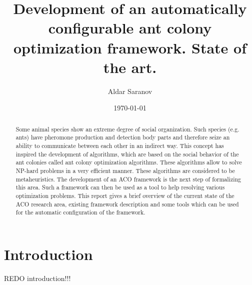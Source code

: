\documentclass[12pt]{article}
\author{Aldar Saranov}
\date{\today}
\title{Development of an automatically configurable ant colony optimization framework. State of the art.}
\begin{document}
\maketitle 
\newpage

\tableofcontents
\newpage

\begin{abstract}
Some animal species show an extreme degree of social organization. Such species (e.g. ants) have pheromone production and detection body parts and therefore seize an ability to communicate between each other in an indirect way. This concept has inspired the development of algorithms, which are based on the social behavior of the ant colonies called ant colony optimization algorithms. These algorithms allow to solve NP-hard problems in a very efficient manner. These algorithms are considered to be metaheuristics. The development of an ACO framework is the next step of formalizing this area. Such a framework can then be used as a tool to help resolving various optimization problems. This report gives a brief overview of the current state of the ACO research area, existing framework description and some tools which can be used for the automatic configuration of the framework.
\end{abstract}




\section{Introduction}


REDO introduction!!!
\end{document}
